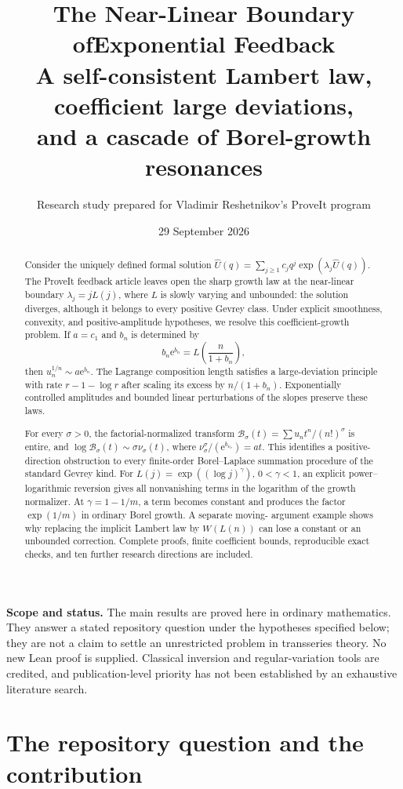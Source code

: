 \documentclass[11pt,a4paper]{article}
\title{\textbf{The Near-Linear Boundary of\newline Exponential Feedback}\\[7pt]
\large A self-consistent Lambert law, coefficient large deviations,\\
and a cascade of Borel-growth resonances}
\author{Research study prepared for Vladimir Reshetnikov's ProveIt program}
\date{29 September 2026}
\numberwithin{equation}{section}
\theoremstyle{definition}
\theoremstyle{remark}
\newcommand{\Uhat}{\widehat U}
\newcommand{\Bcal}{\mathcal B}
\newcommand{\ee}{\mathrm e}
\begin{document}
\maketitle
\thispagestyle{empty}
\begin{abstract}
Consider the uniquely defined formal solution
$\Uhat(q)=\sum_{j\ge1}c_jq^j\exp(\lambda_j\Uhat(q))$.
The ProveIt feedback article leaves open the sharp growth law at the
near-linear boundary $\lambda_j=jL(j)$, where $L$ is slowly varying and
unbounded: the solution diverges, although it belongs to every positive
Gevrey class. Under explicit smoothness, convexity, and positive-amplitude
hypotheses, we resolve this coefficient-growth problem. If $a=c_1$ and
$b_n$ is determined by
\[
 b_n\ee^{b_n}=L\!\left(\frac{n}{1+b_n}\right),
\]
then $u_n^{1/n}\sim a\ee^{b_n}$. The Lagrange composition length satisfies
a large-deviation principle with rate $r-1-\log r$ after scaling its
excess by $n/(1+b_n)$. Exponentially controlled amplitudes and bounded
linear perturbations of the slopes preserve these laws.

For every $\sigma>0$, the factorial-normalized transform
$\Bcal_\sigma(t)=\sum u_nt^n/(n!)^\sigma$ is entire, and
$\log\Bcal_\sigma(t)\sim\sigma\nu_\sigma(t)$, where
$\nu_\sigma^\sigma/(\ee^{b_{\nu_\sigma}})=at$.
This identifies a positive-direction obstruction to every finite-order
Borel--Laplace summation procedure of the standard Gevrey kind.
For $L(j)=\exp((\log j)^\gamma)$, $0<\gamma<1$, an explicit
power--logarithmic reversion gives all nonvanishing terms in the logarithm
of the growth normalizer. At $\gamma=1-1/m$, a term becomes constant and
produces the factor $\exp(1/m)$ in ordinary Borel growth. A separate moving-
argument example shows why replacing the implicit Lambert law by
$W(L(n))$ can lose a constant or an unbounded correction. Complete proofs,
finite coefficient bounds, reproducible exact checks, and ten further
research directions are included.
\end{abstract}
\vfill
\noindent\textbf{Scope and status.} The main results are proved here in ordinary
mathematics. They answer a stated repository question under the hypotheses
specified below; they are not a claim to settle an unrestricted problem in
transseries theory. No new Lean proof is supplied. Classical inversion and
regular-variation tools are credited, and publication-level priority has
not been established by an exhaustive literature search.
\clearpage
\tableofcontents
\clearpage

\section{The repository question and the contribution}
\label{sec:context}
\end{document}
